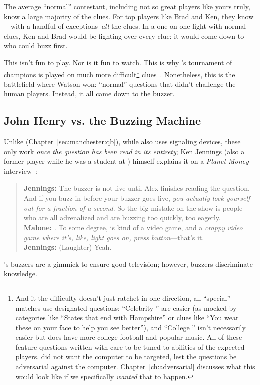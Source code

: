 The average ``normal'' \jeopardy{} contestant, including not so great
players like yours truly, know a large majority of the clues.
%
For top players like Brad and Ken, they know---with a handful of
exceptions--\emph{all} the clues.
%
In a one-on-one fight with normal clues, Ken and Brad would be fighting over
every clue: it would come down to who could buzz first.

This isn't fun to play.
%
Nor is it fun to watch.
%
This is why \jeopardy{}'s tournament of champions is played on much
more difficult\footnote{And it the difficulty doesn't just ratchet in one
  direction, all ``special''
  matches use designated questions: ``Celebrity \jeopardy{}'' are easier (as mocked by
  categories like ``States that end with Hampshire'' or clues like ``You wear
  these on your face to help you see better''), and ``College \jeopardy{}''
  isn't necessarily easier but does have more college football and popular
  music.  All of these feature questions written with care to be tuned to abilities of the
  expected players.   did not want the computer to be targeted, lest
  the questions be adversarial against the computer.
  Chapter~\ref{ch:adversarial} discusses what this would look like if we
  specifically \emph{wanted} that to happen.} clues~\citep{harris-06}.
%
Nonetheless, this is the battlefield where Watson won: ``normal''
questions that didn't challenge the human players.
%
Instead, it all came down to the buzzer.

\subsection{John Henry vs. the Buzzing Machine}
\label{sec:watson:human-buzzing}

Unlike \qb{} (Chapter~\ref{sec:manchester:qb}), while \jeopardy{} also uses
signaling devices, these only work \emph{once the question has been
  read in its entirety}; Ken Jennings (also a former \qb{} player while he was a student at
) himself explains it on a \textit{Planet Money}
interview~\citep{malone-19}:
\begin{quote}
{\bf Jennings:} The buzzer is
    not live until Alex finishes reading the question. And if you buzz
    in before your buzzer goes live, \emph{you actually lock yourself out
    for a fraction of a second}. So the big mistake on the show is
    people who are all adrenalized and are buzzing too quickly, too
    eagerly. \\
{\bf Malone:} . To some degree, \jeopardy{} is kind of a video game, and a \emph{crappy video game where it's, like, light goes on, press button}---that's it. \\
{\bf Jennings:} (Laughter) Yeah. \\
\end{quote}
\jeopardy{}'s buzzers are a gimmick to ensure good television; however, \qb{}
buzzers discriminate knowledge.

